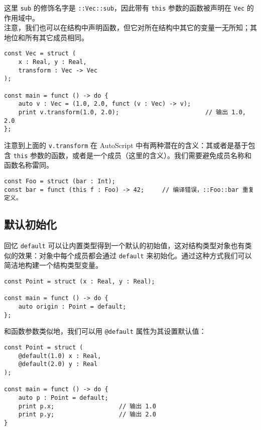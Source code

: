 这里 \lstinline!sub! 的修饰名字是 \lstinline!::Vec::sub!，因此带有 \lstinline!this! 参数的函数被声明在 \lstinline!Vec! 的作用域中。 \\

注意，我们也可以在结构中声明函数，但它对所在结构中其它的变量一无所知；其地位和所有其它成员相同。

\begin{minipage}[c]{0.95\textwidth}
\vspace{1.0em}
\begin{lstlisting}
const Vec = struct (
	x : Real, y : Real,
	transform : Vec -> Vec
);

const main = funct () -> do {
	auto v : Vec = (1.0, 2.0, funct (v : Vec) -> v);
	print v.transform(1.0, 2.0);						// 输出 1.0, 2.0
};
\end{lstlisting}
\end{minipage}


注意到上面的 \lstinline!v.transform! 在 AutoScript 中有两种潜在的含义：其或者是基于包含 \lstinline!this! 参数的函数，或者是一个成员（这里的含义）。我们需要避免成员名称和函数名称雷同。

\begin{lstlisting}
const Foo = struct (bar : Int);
const bar = funct (this f : Foo) -> 42;		// 编译错误，::Foo::bar 重复定义。
\end{lstlisting}


\subsection{默认初始化}

回忆 \lstinline!default! 可以让内置类型得到一个默认的初始值，这对结构类型对象也有类似的效果：对象中每个成员都会通过 \lstinline!default! 来初始化。通过这种方式我们可以简洁地构建一个结构类型变量。

\begin{lstlisting}
const Point = struct (x : Real, y : Real);

const main = funct () -> do {
	auto origin : Point = default;
};
\end{lstlisting}

和函数参数类似地，我们可以用 \lstinline!@default! 属性为其设置默认值：

\begin{lstlisting}
const Point = struct (
	@default(1.0) x : Real,
	@default(2.0) y : Real
);

const main = funct () -> do {
    auto p : Point = default;
    print p.x;					// 输出 1.0
    print p.y;					// 输出 2.0
}
\end{lstlisting}

